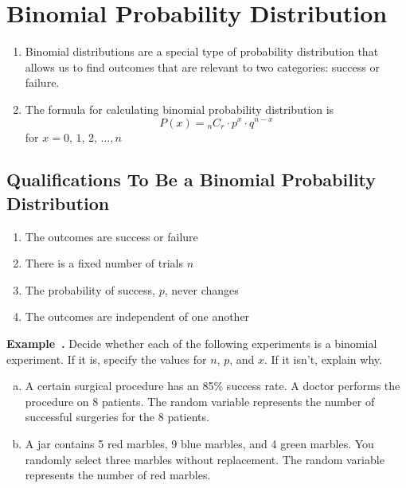 \documentclass{article}
\newcounter{example}[section]
\newenvironment{example}[1][]{\refstepcounter{example}\par\medskip
   {\color{red}\textbf{Example~\theexample. #1}}}{\medskip}
\begin{document}
\section*{Binomial Probability Distribution}

\begin{tcolorbox}[colframe=orange!70!white, coltitle=black, title=\textbf{Summary}]
\begin{enumerate}
    \item Binomial distributions are a special type of probability distribution that allows us to find outcomes that are relevant to two categories: success or failure.
    \item The formula for calculating binomial probability distribution is 
    \[	P(x) = {_n}C_r \cdot p^x \cdot q^{n-x}	\]
for $x = 0, \, 1, \, 2, \, \dots, n$
\end{enumerate}
\end{tcolorbox}
\vspace{0.25in}

\subsection*{Qualifications To Be a Binomial Probability Distribution}

\begin{enumerate}
	\item The outcomes are success or failure
	\item There is a fixed number of trials $n$
	\item The probability of success, $p$, never changes
	\item The outcomes are independent of one another
	\end{enumerate}
\vspace{0.25in}
	
\begin{example}
Decide whether each of the following experiments is a binomial experiment. If it is, specify the values for $n$, $p$, and $x$. If it isn't, explain why.
	\begin{enumerate}[(a)]  \setlength{\itemsep}{0.75in}
	\item A certain surgical procedure has an 85\% success rate. A doctor performs the procedure on 8 patients. The random variable represents the number of successful surgeries for the 8 patients.
	\item A jar contains 5 red marbles, 9 blue marbles, and 4 green marbles. You randomly select three marbles without replacement. The random variable represents the number of red marbles.
	\end{enumerate}
\end{example}
\vspace{0.5in}
\end{document}
